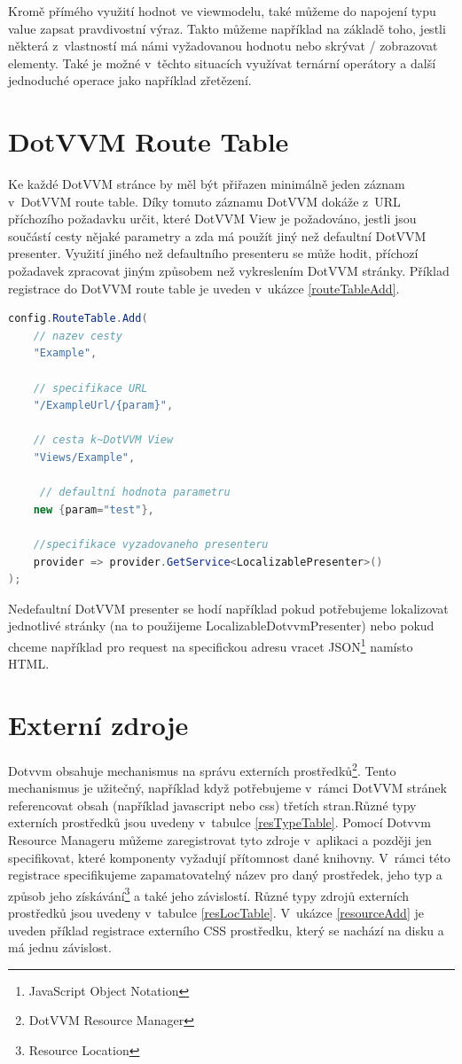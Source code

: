 Kromě přímého využití hodnot ve viewmodelu, také můžeme do napojení typu value zapsat pravdivostní výraz. Takto můžeme například na základě toho, jestli některá z~vlastností má námi vyžadovanou hodnotu nebo skrývat / zobrazovat elementy. Také je možné v~těchto situacích využívat ternární operátory a další jednoduché operace jako například zřetězení. 
\section{DotVVM Route Table}
Ke každé DotVVM stránce by měl být přiřazen minimálně jeden záznam v~DotVVM route table\cite{DotVVM-Routing}. Díky tomuto záznamu DotVVM dokáže z~URL příchozího požadavku určit, které DotVVM View je požadováno, jestli jsou součástí cesty nějaké parametry a zda má použít jiný než defaultní DotVVM presenter. Využití jiného než defaultního presenteru se může hodit, příchozí požadavek zpracovat jiným způsobem než vykreslením DotVVM stránky. Příklad registrace do DotVVM route table je uveden v~ukázce \ref{routeTableAdd}.
\pagebreak
\begin{lstlisting}[language=C#, caption=Ukázka přidání záznamu do DotVVM route table v~rámci DotvvmStartup.cs.,label=routeTableAdd,captionpos=t]
config.RouteTable.Add(
    // nazev cesty
    "Example",
    
    // specifikace URL
    "/ExampleUrl/{param}",
    
    // cesta k~DotVVM View
    "Views/Example", 
    
     // defaultní hodnota parametru
    new {param="test"},
    
    //specifikace vyzadovaneho presenteru
    provider => provider.GetService<LocalizablePresenter>()
);
\end{lstlisting}

Nedefaultní DotVVM presenter se hodí například pokud potřebujeme lokalizovat jednotlivé stránky (na to použijeme LocalizableDotvvmPresenter) nebo pokud chceme například pro request na specifickou adresu vracet JSON\footnote{JavaScript Object Notation} namísto HTML.
\section{Externí zdroje}
Dotvvm obsahuje mechanismus na správu externích prostředků\footnote{DotVVM Resource Manager}. Tento mechanismus je užitečný, například když potřebujeme v~rámci DotVVM stránek referencovat obsah (například javascript nebo css) třetích stran.Různé typy externích prostředků jsou uvedeny v~tabulce \ref{resTypeTable}. Pomocí Dotvvm Resource Manageru můžeme zaregistrovat tyto zdroje v~aplikaci a později jen specifikovat, které komponenty vyžadují přítomnost dané knihovny. V~rámci této registrace specifikujeme zapamatovatelný název pro daný prostředek, jeho typ a způsob jeho získávání\footnote{ Resource Location } a také jeho závislostí. Různé typy zdrojů externích prostředků jsou uvedeny v~tabulce \ref{resLocTable}.  V~ukázce \ref{resourceAdd} je uveden příklad registrace externího CSS prostředku, který se nachází na disku a má jednu závislost.

